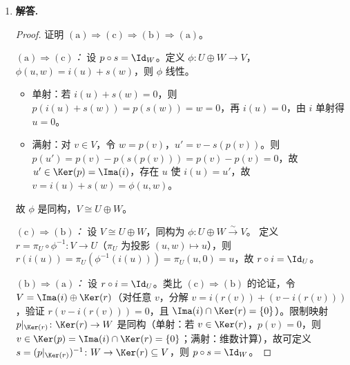 \begin{enumerate}[label=\textbf{\arabic*.}, leftmargin=*, itemsep=1em]
\begin{proof}
\emph{核：} $\rho(\varphi)=\varphi|_U=0\Leftrightarrow\varphi\in U^0$，故 $\Ker(\rho)=U^0$。

\emph{同构：} 由第一同构定理，$\rho$ 诱导同构
\[
  V^*/\Ker(\rho)=V^*/U^0\xrightarrow{\;\sim\;}U^*. \qedhere
\]
\end{proof}

\item \textbf{解答.}
\begin{proof}
证明 $\mathrm{(a)}\Rightarrow\mathrm{(c)}\Rightarrow\mathrm{(b)}\Rightarrow\mathrm{(a)}$。

\emph{$\mathrm{(a)}\Rightarrow\mathrm{(c)}$：} 设 $p\circ s=\Id_W$。定义 $\phi\colon U\oplus W\to V$，$\phi(u,w)=i(u)+s(w)$，则 $\phi$ 线性。
\begin{itemize}
  \item 单射：若 $i(u)+s(w)=0$，则 $p(i(u)+s(w))=p(s(w))=w=0$，再 $i(u)=0$，由 $i$ 单射得 $u=0$。
  \item 满射：对 $v\in V$，令 $w=p(v)$，$u'=v-s(p(v))$。则 $p(u')=p(v)-p(s(p(v)))=p(v)-p(v)=0$，故 $u'\in\Ker(p)=\Ima(i)$，存在 $u$ 使 $i(u)=u'$，故 $v=i(u)+s(w)=\phi(u,w)$。
\end{itemize}
故 $\phi$ 是同构，$V\cong U\oplus W$。

\emph{$\mathrm{(c)}\Rightarrow\mathrm{(b)}$：} 设 $V\cong U\oplus W$，同构为 $\phi\colon U\oplus W\xrightarrow{\sim}V$。
定义 $r=\pi_U\circ\phi^{-1}\colon V\to U$（$\pi_U$ 为投影 $(u,w)\mapsto u$），则 $r(i(u))=\pi_U(\phi^{-1}(i(u)))=\pi_U(u,0)=u$，故 $r\circ i=\Id_U$。

\emph{$\mathrm{(b)}\Rightarrow\mathrm{(a)}$：} 设 $r\circ i=\Id_U$。类比 $\mathrm{(c)}\Rightarrow\mathrm{(b)}$ 的论证，令 $V=\Ima(i)\oplus\Ker(r)$（对任意 $v$，分解 $v=i(r(v))+(v-i(r(v)))$，验证 $r(v-i(r(v)))=0$，且 $\Ima(i)\cap\Ker(r)=\{0\}$）。限制映射 $p|_{\Ker(r)}\colon\Ker(r)\to W$ 是同构（单射：若 $v\in\Ker(r)$，$p(v)=0$，则 $v\in\Ker(p)=\Ima(i)\cap\Ker(r)=\{0\}$；满射：维数计算），故可定义 $s=(p|_{\Ker(r)})^{-1}\colon W\to\Ker(r)\subseteq V$，则 $p\circ s=\Id_W$。
\end{proof}

\end{enumerate}
